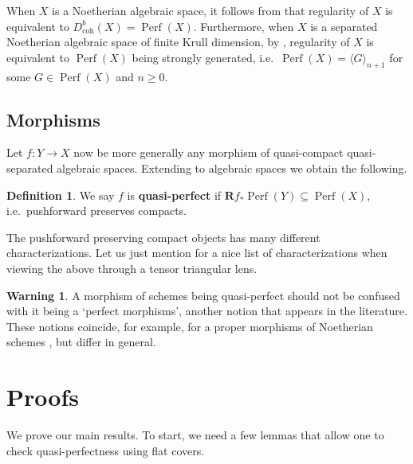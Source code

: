 \documentclass[11pt]{amsart}
\theoremstyle{plain}
\theoremstyle{definition}
\newtheorem{definition}[theorem]{Definition}
\newtheorem*{warning}{Warning}
\numberwithin{equation}{section}
\numberwithin{theorem}{section}
\begin{document}
When $X$ is a Noetherian algebraic space, it follows from \cite[Theorem 3.7]{DeDeyn/Lank/ManaliRahul/Peng:2025} that regularity of $X$ is equivalent to $D^b_{\operatorname{coh}}(X) = \operatorname{Perf}(X)$. 
Furthermore, when $X$ is a separated Noetherian algebraic space of finite Krull dimension, by \cite[Theorem 5.1]{DeDeyn/Lank/ManaliRahul/Peng:2025}, regularity of $X$ is equivalent to $\operatorname{Perf}(X)$ being strongly generated, i.e.\ $\operatorname{Perf}(X)=\langle G \rangle_{n+1}$ for some $G\in \operatorname{Perf}(X)$ and $n\geq 0$.

\subsection{Morphisms}
\label{sec:prelim_morphisms}

Let $f\colon Y\to X$ now be more generally any morphism of quasi-compact quasi-separated algebraic spaces. 
Extending \cite{Lipman/Neeman:2007} to algebraic spaces we obtain the following.

\begin{definition}
    \label{def:q-perfect}
    We say $f$ is \textbf{quasi-perfect} if $\mathbf{R}f_\ast \operatorname{Perf}(Y)\subseteq \operatorname{Perf}(X)$, i.e.\ pushforward preserves compacts. 
\end{definition}

The pushforward preserving compact objects has many different characterizations. Let us just mention \cite[Theorem 3.3]{Balmer/Dellambrogio/Sanders:2016} for a nice list of characterizations when viewing the above through a tensor triangular lens. 

\begin{warning}
    A morphism of schemes being quasi-perfect should not be confused with it being a `perfect morphisms', another notion that appears in the literature. These notions coincide, for example, for a proper morphisms of Noetherian schemes \cite[Theorem 1.2]{Lipman/Neeman:2007}, but differ in general.
\end{warning}

\section{Proofs}
\label{sec:proofs}

We prove our main results. To start, we need a few lemmas that allow one to check quasi-perfectness using flat covers.
\end{document}
